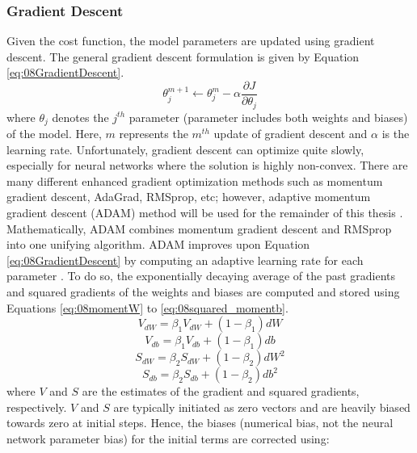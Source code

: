 \subsubsection{Gradient Descent}
Given the cost function, the model parameters are updated using gradient descent. The general gradient descent formulation is given by Equation \ref{eq:08GradientDescent}.  
\begin{equation}
    \theta_j^{m+1} \leftarrow \theta_j^{m} - \alpha \frac{\partial J}{\partial \theta_j}
    \label{eq:08GradientDescent}
\end{equation}
where $\theta_j$ denotes the $j^{th}$ parameter (parameter includes both weights and biases) of the model.  Here, $m$ represents the $m^{th}$ update of gradient descent and $\alpha$ is the learning rate. Unfortunately, gradient descent can optimize quite slowly, especially for neural networks where the solution is highly non-convex. There are many different enhanced gradient optimization methods such as momentum gradient descent, AdaGrad, RMSprop, etc; however, adaptive momentum gradient descent (ADAM) method will be used for the remainder of this thesis \cite{ADAM}. Mathematically, ADAM combines momentum gradient descent and RMSprop into one unifying algorithm. ADAM improves upon Equation \ref{eq:08GradientDescent} by computing an adaptive learning rate for each parameter \cite{ADAM}. To do so, the exponentially decaying average of the past gradients and squared gradients of the weights and biases are computed and stored using Equations \ref{eq:08momentW} to \ref{eq:08squared_momentb}.
\begin{equation}
    V_{dW} = \beta_1 V_{dW} + (1 - \beta_1)dW
    \label{eq:08momentW}
\end{equation}
\begin{equation}
    V_{db} = \beta_1 V_{db} + (1 - \beta_1)db
    \label{eq:08momentb}
\end{equation}
\begin{equation}
    S_{dW} = \beta_2 S_{dW} + (1 - \beta_2)dW^2
    \label{eq:08squared_momentW}
\end{equation}
\begin{equation}
    S_{db} = \beta_2 S_{db} + (1 - \beta_2)db^2
    \label{eq:08squared_momentb}
\end{equation}
where $V$ and $S$ are the estimates of the gradient and squared gradients, respectively.  $V$ and $S$ are typically initiated as zero vectors and are heavily biased towards zero at initial steps.  Hence, the biases (numerical bias, not the neural network parameter bias) for the initial terms are corrected using:
